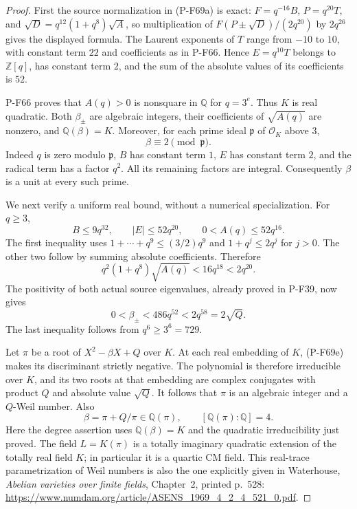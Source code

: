 \begin{proof}
First the source normalization in (P-F69a) is exact:
$F=q^{-16}B$, $P=q^{20}T$, and
$\sqrt D=q^{12}(1+q^8)\sqrt A$, so multiplication of
$F(P\pm\sqrt D)/(2q^{20})$ by $2q^{26}$ gives the displayed
formula.  The Laurent exponents of $T$ range from $-10$
to $10$, with constant term $22$ and coefficients as in
P-F66.  Hence $E=q^{10}T$ belongs to $\mathbb Z[q]$,
has constant term $2$, and the sum of the absolute values
of its coefficients is $52$.

P-F66 proves that $A(q)>0$ is nonsquare in $\mathbb Q$ for
$q=3^e$.  Thus $K$ is real quadratic.  Both $\beta_\pm$
are algebraic integers, their coefficients of $\sqrt{A(q)}$
are nonzero, and $\mathbb Q(\beta)=K$.  Moreover, for each
prime ideal $\mathfrak p$ of $\mathcal O_K$ above $3$,
\[
                        \beta\equiv2\pmod{\mathfrak p}.        \tag{P-F69d}
\]
Indeed $q$ is zero modulo $\mathfrak p$, $B$ has constant
term $1$, $E$ has constant term $2$, and the radical term
has a factor $q^2$.  All its remaining factors are integral.
Consequently $\beta$ is a unit at every such prime.

We next verify a uniform real bound, without a numerical
specialization.  For $q\ge3$,
\[
  B\le9q^{32},\qquad |E|\le52q^{20},\qquad
                  0<A(q)\le52q^{16}.
\]
The first inequality uses
$1+\cdots+q^9\le(3/2)q^9$ and
$1+q^j\le2q^j$ for $j>0$.  The other two follow by summing
absolute coefficients.  Therefore
\[
 q^2(1+q^8)\sqrt{A(q)}<16q^{18}<2q^{20}.
\]
The positivity of both actual source eigenvalues, already
proved in P-F39, now gives
\[
           0<\beta_\pm<486q^{52}<2q^{58}=2\sqrt Q.             \tag{P-F69e}
\]
The last inequality follows from $q^6\ge3^6=729$.

Let $\pi$ be a root of $X^2-\beta X+Q$ over $K$.
At each real embedding of $K$, (P-F69e) makes its
discriminant strictly negative.  The polynomial is therefore
irreducible over $K$, and its two roots at that embedding
are complex conjugates with product $Q$ and absolute value
$\sqrt Q$.  It follows that $\pi$ is an algebraic integer
and a $Q$-Weil number.  Also
\[
          \beta=\pi+Q/\pi\in\mathbb Q(\pi),
          \qquad [\mathbb Q(\pi):\mathbb Q]=4.                 \tag{P-F69f}
\]
Here the degree assertion uses $\mathbb Q(\beta)=K$ and
the quadratic irreducibility just proved.  The field
$L=K(\pi)$ is a totally imaginary quadratic extension of
the totally real field $K$; in particular it is a quartic
CM field.  This real-trace parametrization of Weil numbers
is also the one explicitly given in Waterhouse,
\emph{Abelian varieties over finite fields}, Chapter~2,
printed p.~528:
\url{https://www.numdam.org/article/ASENS_1969_4_2_4_521_0.pdf}.


\end{proof}
